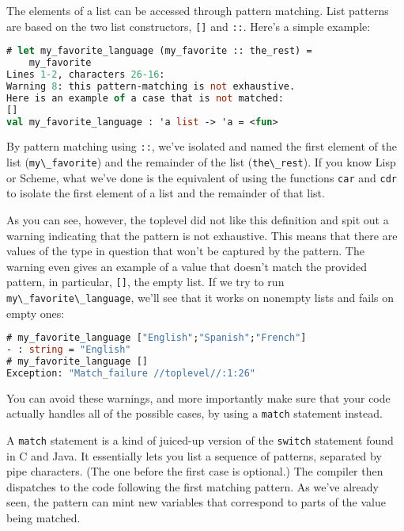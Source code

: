 The elements of a list can be accessed through pattern matching. List
patterns are based on the two list constructors,
\passthrough{\lstinline![]!} and \passthrough{\lstinline!::!}. Here's a
simple example:

\begin{lstlisting}[language=Caml]
# let my_favorite_language (my_favorite :: the_rest) =
    my_favorite
Lines 1-2, characters 26-16:
Warning 8: this pattern-matching is not exhaustive.
Here is an example of a case that is not matched:
[]
val my_favorite_language : 'a list -> 'a = <fun>
\end{lstlisting}

By pattern matching using \passthrough{\lstinline!::!}, we've isolated
and named the first element of the list
(\passthrough{\lstinline!my\_favorite!}) and the remainder of the list
(\passthrough{\lstinline!the\_rest!}). If you know Lisp or Scheme, what
we've done is the equivalent of using the functions
\passthrough{\lstinline!car!} and \passthrough{\lstinline!cdr!} to
isolate the first element of a list and the remainder of that list.

As you can see, however, the toplevel did not like this definition and
spit out a warning indicating that the pattern is not exhaustive. This
means that there are values of the type in question that won't be
captured by the pattern. The warning even gives an example of a value
that doesn't match the provided pattern, in particular,
\passthrough{\lstinline![]!}, the empty list. If we try to run
\passthrough{\lstinline!my\_favorite\_language!}, we'll see that it
works on nonempty lists and fails on empty ones:

\begin{lstlisting}[language=Caml]
# my_favorite_language ["English";"Spanish";"French"]
- : string = "English"
# my_favorite_language []
Exception: "Match_failure //toplevel//:1:26"
\end{lstlisting}

You can avoid these warnings, and more importantly make sure that your
code actually handles all of the possible cases, by using a
\passthrough{\lstinline!match!} statement instead.

A \passthrough{\lstinline!match!} statement is a kind of juiced-up
version of the \passthrough{\lstinline!switch!} statement found in C and
Java. It essentially lets you list a sequence of patterns, separated by
pipe characters. (The one before the first case is optional.) The
compiler then dispatches to the code following the first matching
pattern. As we've already seen, the pattern can mint new variables that
correspond to parts of the value being matched.

